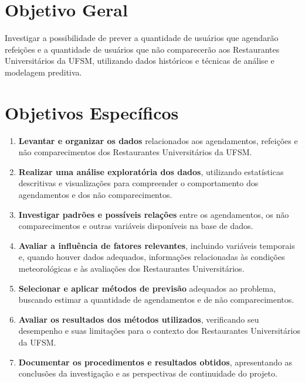 \documentclass{article}
\begin{document}
\section{Objetivo Geral}
\label{sec:objgeral}

Investigar a possibilidade de prever a quantidade de usuários que agendarão refeições e a quantidade de usuários que não comparecerão aos Restaurantes Universitários da UFSM, utilizando dados históricos e técnicas de análise e modelagem preditiva.

\section{Objetivos Específicos}
\label{sec:objespec}

\begin{enumerate}[label=\arabic*.]
    \item \textbf{Levantar e organizar os dados} relacionados aos agendamentos, refeições e não comparecimentos dos Restaurantes Universitários da UFSM.

    \item \textbf{Realizar uma análise exploratória dos dados}, utilizando estatísticas descritivas e visualizações para compreender o comportamento dos agendamentos e dos não comparecimentos.

    \item \textbf{Investigar padrões e possíveis relações} entre os agendamentos, os não comparecimentos e outras variáveis disponíveis na base de dados.

    \item \textbf{Avaliar a influência de fatores relevantes}, incluindo variáveis temporais e, quando houver dados adequados, informações relacionadas às condições meteorológicas e às avaliações dos Restaurantes Universitários.

    \item \textbf{Selecionar e aplicar métodos de previsão} adequados ao problema, buscando estimar a quantidade de agendamentos e de não comparecimentos.

    \item \textbf{Avaliar os resultados dos métodos utilizados}, verificando seu desempenho e suas limitações para o contexto dos Restaurantes Universitários da UFSM.

    \item \textbf{Documentar os procedimentos e resultados obtidos}, apresentando as conclusões da investigação e as perspectivas de continuidade do projeto.
\end{enumerate}
\end{document}
